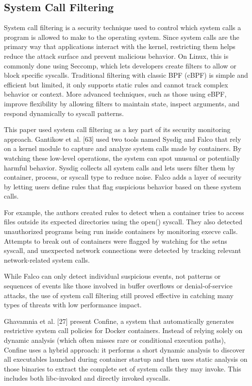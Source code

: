 \documentclass[12pt]{report}
\begin{document}
\begin{doublespace}
\subsection{System Call Filtering}

System call filtering is a security technique used to control which system calls a program is allowed to make to the operating system. Since system calls are the primary way that applications interact with the kernel, restricting them helps reduce the attack surface and prevent malicious behavior. On Linux, this is commonly done using Seccomp, which lets developers create filters to allow or block specific syscalls. Traditional filtering with classic BPF (cBPF) is simple and efficient but limited, it only supports static rules and cannot track complex behavior or context. More advanced techniques, such as those using eBPF, improve flexibility by allowing filters to maintain state, inspect arguments, and respond dynamically to syscall patterns. 

This paper used system call filtering as a key part of its security monitoring approach. Gantikow et al. [63] used two tools named Sysdig and Falco that rely on a kernel module to capture and analyze system calls made by containers. By watching these low-level operations, the system can spot unusual or potentially harmful behavior. Sysdig collects all system calls and lets users filter them by container, process, or syscall type to reduce noise. Falco adds a layer of security by letting users define rules that flag suspicious behavior based on these system calls.

For example, the authors created rules to detect when a container tries to access files outside its expected directories using the open() syscall. They also detected unauthorized programs being run inside containers by monitoring execve calls. Attempts to break out of containers were flagged by watching for the setns syscall, and unexpected network connections were detected by tracking relevant network-related system calls.

While Falco can only detect individual suspicious events, not patterns or sequences of events like those involved in buffer overflows or denial-of-service attacks, the use of system call filtering still proved effective in catching many types of threats with low performance impact.

Ghavamnia et al. [27] present Confine, a system that automatically generates restrictive system call policies for Docker containers. Instead of relying solely on dynamic analysis (which often misses rare or conditional execution paths), Confine uses a hybrid approach: it performs a short dynamic analysis to discover all executables launched during container startup and then uses static analysis on those binaries to extract the complete set of system calls they may invoke. This includes both libc-invoked and directly invoked syscalls.


\end{doublespace}
\end{document}

